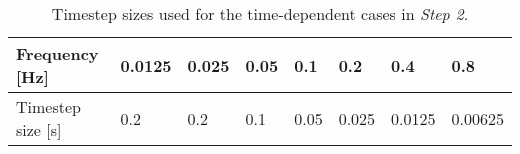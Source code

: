 \begin{table}[htb!]
    \caption{Timestep sizes used for the time-dependent cases in
    \textit{Step 2}.}
    \footnotesize
	\centering
	\setlength\tabcolsep{2.5pt}
	\begin{tabular}{l l l l l l l l}
	    \toprule
	    Frequency [Hz] & 0.0125 & 0.025 & 0.05 & 0.1 & 0.2 & 0.4 & 0.8 \\
	    \midrule
	    Timestep size [s] & 0.2 & 0.2 & 0.1 & 0.05 & 0.025 & 0.0125 & 0.00625
	    \\
	    \bottomrule
	\end{tabular}
	\label{table:timestep}
\end{table}